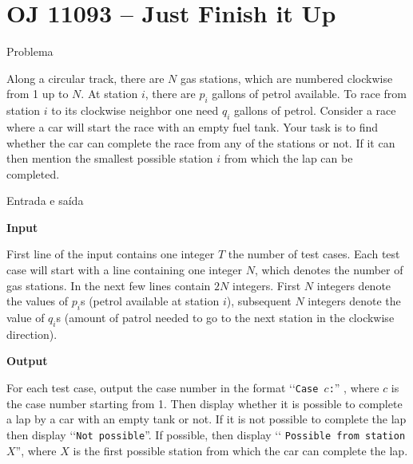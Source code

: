 \section{OJ 11093 -- Just Finish it Up}

\begin{frame}[fragile]{Problema}

Along a circular track, there are $N$ gas stations, which are numbered clockwise from 1 up to $N$. 
At station $i$, there are $p_i$ gallons of petrol available. To race from station $i$ to its 
clockwise neighbor one need $q_i$ gallons of petrol. Consider a race where a car will start the 
race with an empty fuel tank. Your task is to find whether the car can complete the race from any 
of the stations or not. If it can then mention the smallest possible station $i$ from which the 
lap can be completed.

\end{frame}
 
\begin{frame}[fragile]{Entrada e saída}

\textbf{Input}

First line of the input contains one integer $T$ the number of test cases. Each test case will 
start with a line containing one integer $N$, which denotes the number of gas stations. In the 
next few lines contain $2N$ integers. First $N$ integers denote the values of $p_i$s 
(petrol available at station $i$), subsequent $N$ integers denote the value of $q_i$s 
(amount of patrol needed to go to the next station in the clockwise direction).

\textbf{Output}

For each test case, output the case number in the format \lq\lq \texttt{Case $c$:}” , 
where $c$ is the case number starting from 1. Then display whether it is possible to complete a 
lap by a car with an empty tank or not. If it is not possible to complete the lap then display 
\lq\lq \texttt{Not possible}”. If possible, then display \lq\lq 
\texttt{Possible from station $X$}”, where $X$ is the first possible station from which the car 
can complete the lap.

\end{frame}


